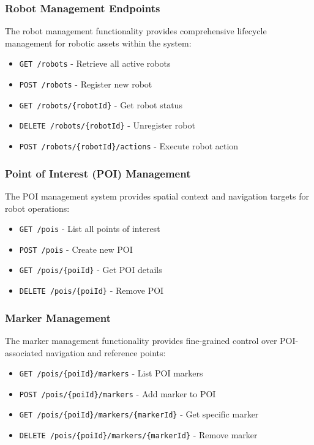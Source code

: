 \documentclass[runningheads]{llncs}
\begin{document}
\subsubsection{Robot Management Endpoints}

The robot management functionality provides comprehensive lifecycle management for robotic assets within the system:

\begin{itemize}
    \item \texttt{GET /robots} - Retrieve all active robots
    \item \texttt{POST /robots} - Register new robot
    \item \texttt{GET /robots/\{robotId\}} - Get robot status
    \item \texttt{DELETE /robots/\{robotId\}} - Unregister robot
    \item \texttt{POST /robots/\{robotId\}/actions} - Execute robot action
\end{itemize}

\subsubsection{Point of Interest (POI) Management}

The POI management system provides spatial context and navigation targets for robot operations:

\begin{itemize}
    \item \texttt{GET /pois} - List all points of interest
    \item \texttt{POST /pois} - Create new POI
    \item \texttt{GET /pois/\{poiId\}} - Get POI details
    \item \texttt{DELETE /pois/\{poiId\}} - Remove POI
\end{itemize}

\subsubsection{Marker Management}

The marker management functionality provides fine-grained control over POI-associated navigation and reference points:

\begin{itemize}
    \item \texttt{GET /pois/\{poiId\}/markers} - List POI markers
    \item \texttt{POST /pois/\{poiId\}/markers} - Add marker to POI
    \item \texttt{GET /pois/\{poiId\}/markers/\{markerId\}} - Get specific marker
    \item \texttt{DELETE /pois/\{poiId\}/markers/\{markerId\}} - Remove marker
\end{itemize}
\end{document}
